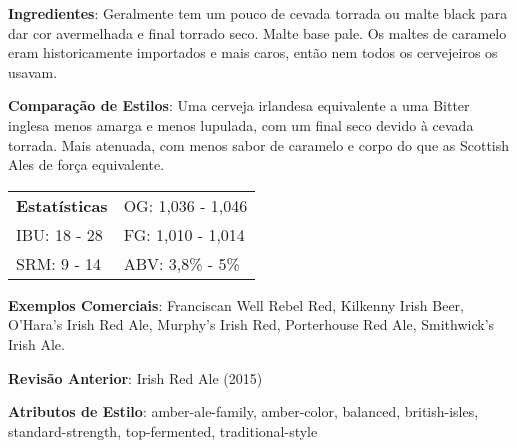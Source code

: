 \textbf{Ingredientes}: Geralmente tem um pouco de cevada torrada ou malte black para dar cor avermelhada e final torrado seco. Malte base pale. Os maltes de caramelo eram historicamente importados e mais caros, então nem todos os cervejeiros os usavam.

\textbf{Comparação de Estilos}: Uma cerveja irlandesa equivalente a uma Bitter inglesa menos amarga e menos lupulada, com um final seco devido à cevada torrada. Mais atenuada, com menos sabor de caramelo e corpo do que as Scottish Ales de força equivalente.

\begin{tabular}{@{}p{35mm}p{35mm}@{}}
  \textbf{Estatísticas} & OG: 1,036 - 1,046 \\
  IBU: 18 - 28  & FG: 1,010 - 1,014 \\
  SRM: 9 - 14  & ABV: 3,8\% - 5\%
\end{tabular}

\textbf{Exemplos Comerciais}: Franciscan Well Rebel Red, Kilkenny Irish Beer, O'Hara's Irish Red Ale, Murphy's Irish Red, Porterhouse Red Ale, Smithwick's Irish Ale.

\textbf{Revisão Anterior}: Irish Red Ale (2015)

\textbf{Atributos de Estilo}: amber-ale-family, amber-color, balanced, british-isles, standard-strength, top-fermented, traditional-style
